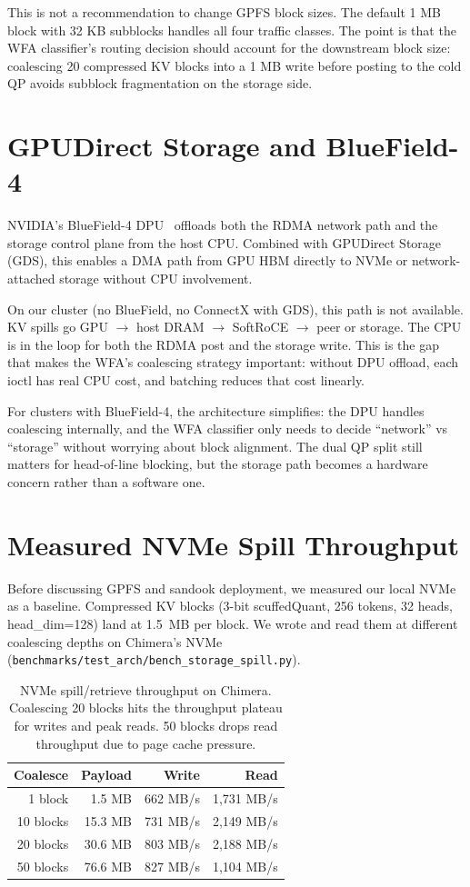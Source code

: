 \documentclass[11pt,letterpaper]{article}
\begin{document}
This is not a recommendation to change GPFS block sizes. The default 1 MB block with 32 KB subblocks handles all four traffic classes. The point is that the WFA classifier's routing decision should account for the downstream block size: coalescing 20 compressed KV blocks into a 1 MB write before posting to the cold QP avoids subblock fragmentation on the storage side.

\section{GPUDirect Storage and BlueField-4}

NVIDIA's BlueField-4 DPU~\cite{bf4_cmx} offloads both the RDMA network path and the storage control plane from the host CPU. Combined with GPUDirect Storage (GDS), this enables a DMA path from GPU HBM directly to NVMe or network-attached storage without CPU involvement.

On our cluster (no BlueField, no ConnectX with GDS), this path is not available. KV spills go GPU $\to$ host DRAM $\to$ SoftRoCE $\to$ peer or storage. The CPU is in the loop for both the RDMA post and the storage write. This is the gap that makes the WFA's coalescing strategy important: without DPU offload, each ioctl has real CPU cost, and batching reduces that cost linearly.

For clusters with BlueField-4, the architecture simplifies: the DPU handles coalescing internally, and the WFA classifier only needs to decide ``network'' vs ``storage'' without worrying about block alignment. The dual QP split still matters for head-of-line blocking, but the storage path becomes a hardware concern rather than a software one.

\section{Measured NVMe Spill Throughput}

Before discussing GPFS and sandook deployment, we measured our local NVMe as a baseline. Compressed KV blocks (3-bit scuffedQuant, 256 tokens, 32 heads, head\_dim=128) land at 1.5~MB per block. We wrote and read them at different coalescing depths on Chimera's NVMe (\texttt{benchmarks/test\_arch/bench\_storage\_spill.py}).

\begin{table}[ht]
\centering\small
\begin{tabular}{rrrr}
\toprule
\textbf{Coalesce} & \textbf{Payload} & \textbf{Write} & \textbf{Read} \\
\midrule
1 block & 1.5 MB & 662 MB/s & 1,731 MB/s \\
10 blocks & 15.3 MB & 731 MB/s & 2,149 MB/s \\
20 blocks & 30.6 MB & 803 MB/s & 2,188 MB/s \\
50 blocks & 76.6 MB & 827 MB/s & 1,104 MB/s \\
\bottomrule
\end{tabular}
\caption{NVMe spill/retrieve throughput on Chimera. Coalescing 20 blocks hits the throughput plateau for writes and peak reads. 50 blocks drops read throughput due to page cache pressure.}
\label{tab:nvme_measured}
\end{table}
\end{document}
